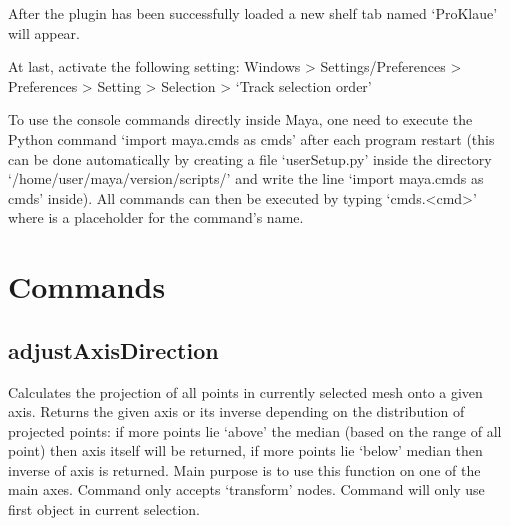\documentclass[letterpaper,10pt,english]{sphinxmanual}
\begin{document}
After the plugin has been successfully loaded a new shelf tab named ‘ProKlaue’ will appear.

At last, activate the following setting: Windows \textendash{}\textgreater{} Settings/Preferences \textendash{}\textgreater{} Preferences \textendash{}\textgreater{} Setting \textendash{}\textgreater{} Selection \textendash{}\textgreater{} ‘Track selection order’

To use the console commands directly inside Maya, one need to execute the Python command ‘import maya.cmds as cmds’ after each program restart (this can be done automatically by creating a file ‘userSetup.py’ inside the directory ‘/home/user/maya/version/scripts/’ and write the line ‘import maya.cmds as cmds’ inside). All commands can then be executed by typing ‘cmds.\textless{}cmd\textgreater{}’ where  is a placeholder for the command’s name.


\chapter{Commands}
\label{\detokenize{index:commands}}\label{\detokenize{index:id1}}

\section{adjustAxisDirection}
\label{\detokenize{pk_src.adjustAxisDirection::doc}}\label{\detokenize{pk_src.adjustAxisDirection:adjustaxisdirection}}\label{\detokenize{pk_src.adjustAxisDirection:id1}}
{\hyperref[\detokenize{index:commands}]{}}
\label{\detokenize{pk_src.adjustAxisDirection:module-pk_src.adjustAxisDirection}}
Calculates the projection of all points in currently selected mesh onto a given axis. Returns the given axis or its inverse depending on the distribution of projected points: if more points lie ‘above’ the median (based on the range of all point) then axis itself will be returned, if more points lie ‘below’ median then inverse of axis is returned. Main purpose is to use this function on one of the main axes.
Command only accepts ‘transform’ nodes. Command will only use first object in current selection.
\end{document}
